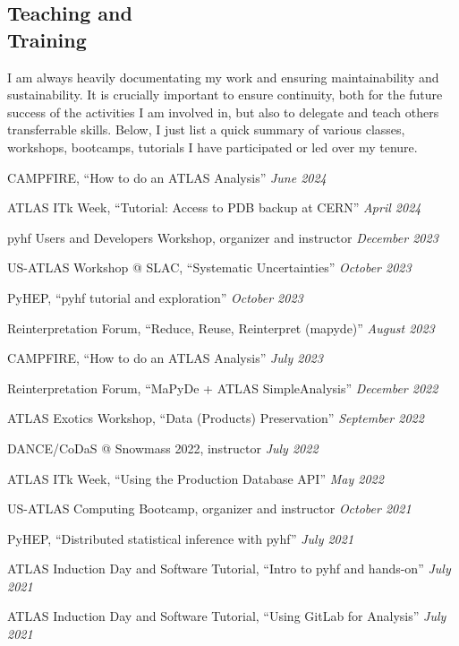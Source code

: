 \documentclass[margin,line]{resume}
\let\origsection\section%
\let\section\subsection%
\let\section\origsection%
\begin{document}
\begin{resume}
\section{\mysidestyle Teaching and\\Training}
I am always heavily documentating my work and ensuring maintainability and sustainability. It is crucially important to ensure continuity, both for the future success of the activities I am involved in, but also to delegate and teach others transferrable skills. Below, I just list a quick summary of various classes, workshops, bootcamps, tutorials I have participated or led over my tenure.
\begin{list2}
  \item CAMPFIRE, ``How to do an ATLAS Analysis'' \hfill \textsl{June 2024}
  \item ATLAS ITk Week, ``Tutorial: Access to PDB backup at CERN'' \hfill \textsl{April 2024}
  \item pyhf Users and Developers Workshop, organizer and instructor \hfill \textsl{December 2023}
  \item US-ATLAS Workshop @ SLAC, ``Systematic Uncertainties'' \hfill \textsl{October 2023}
  \item PyHEP, ``pyhf tutorial and exploration'' \hfill \textsl{October 2023}
  \item Reinterpretation Forum, ``Reduce, Reuse, Reinterpret (mapyde)'' \hfill \textsl{August 2023}
  \item CAMPFIRE, ``How to do an ATLAS Analysis'' \hfill \textsl{July 2023}
  \item Reinterpretation Forum, ``MaPyDe + ATLAS SimpleAnalysis'' \hfill \textsl{December 2022}
  \item ATLAS Exotics Workshop, ``Data (Products) Preservation'' \hfill \textsl{September 2022}
  \item DANCE/CoDaS @ Snowmass 2022, instructor \hfill \textsl{July 2022}
  \item ATLAS ITk Week, ``Using the Production Database API'' \hfill \textsl{May 2022}
  \item US-ATLAS Computing Bootcamp, organizer and instructor \hfill \textsl{October 2021}
  \item PyHEP, ``Distributed statistical inference with pyhf'' \hfill \textsl{July 2021}
  \item ATLAS Induction Day and Software Tutorial, ``Intro to pyhf and hands-on'' \hfill \textsl{July 2021}
  \item ATLAS Induction Day and Software Tutorial, ``Using GitLab for Analysis'' \hfill \textsl{July 2021}

\end{list2}
\end{resume}
\end{document}

